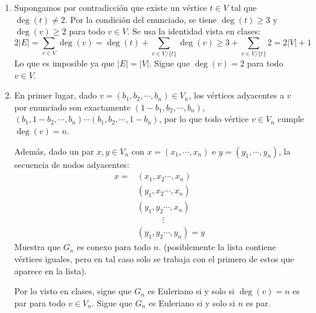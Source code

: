 \begin{enumerate}[label=(\alph*)]
    \item Supongamos por contradicción que existe un vértice $t\in V$ tal que $\deg(t)\neq 2$. Por la condición del enunciado, se tiene $\deg(t)\geq 3$ y $\deg(v)\geq 2$ para todo $v\in V$. Se usa la identidad vista en clases:
    \[
    2|E|=\sum_{v\in V}\deg(v)=\deg(t)+\sum_{v\in V/\{t\}}\deg(v)\geq 3+\sum_{v\in V/\{t\}}2=2|V|+1
    \]
    Lo que es imposible ya que $|E|=|V|$. Sigue que $\deg(v)=2$ para todo $v\in V$.
    \item En primer lugar, dado $v=(b_1,b_2,\cdots,b_n)\in V_n$, los vértices adyacentes a $v$ por enunciado son exactamente $(1-b_1,b_2,\cdots,b_n)$, $(b_1,1-b_2,\cdots,b_n)\cdots (b_1,b_2,\cdots,1-b_n)$, por lo que todo vértice $v\in V_n$ cumple $\deg(v)=n$.

    Además, dado un par $x,y\in V_n$ con $x=(x_1,\cdots,x_n)$ e $y=(y_1,\cdots,y_n)$, la secuencia de nodos adyacentes:
    \begin{align*}
        x = &(x_1,x_2\cdots,x_n)\\
        &(y_1,x_2\cdots,x_n)\\
        &(y_1,y_2\cdots,x_n)\\
        &\quad \quad \quad \vdots \\
        &(y_1,y_2\cdots,y_n)=y
    \end{align*}
    Muestra que $G_n$ es conexo para todo $n$. (posiblemente la lista contiene vértices iguales, pero en tal caso solo se trabaja con el primero de estos que aparece en la lista).

    Por lo visto en clases, sigue que $G_n$ es Euleriano si y solo si $\deg(v)=n$ es par para todo $v\in V_n$. Sigue que $G_n$ es Euleriano si y solo si $n$ es par.
\end{enumerate}